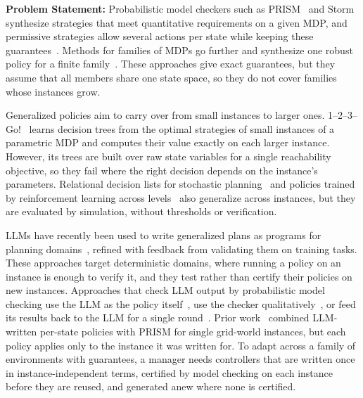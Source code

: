 \textbf{Problem Statement:}
Probabilistic model checkers such as PRISM~\cite{TODO-PRISM} and Storm~\cite{TODO-Storm} synthesize strategies that meet quantitative requirements on a given MDP, and permissive strategies allow several actions per state while keeping these guarantees~\cite{TODO-Draeger2015-permissive}.
Methods for families of MDPs go further and synthesize one robust policy for a finite family~\cite{TODO-Andriushchenko2024-PoliciesGrowOnTrees,TODO-Heck2026-SMPMC}.
These approaches give exact guarantees, but they assume that all members share one state space, so they do not cover families whose instances grow.

Generalized policies aim to carry over from small instances to larger ones.
1--2--3--Go!~\cite{TODO-Azeem2025-123Go} learns decision trees from the optimal strategies of small instances of a parametric MDP and computes their value exactly on each larger instance.
However, its trees are built over raw state variables for a single reachability objective, so they fail where the right decision depends on the instance's parameters.
Relational decision lists for stochastic planning~\cite{TODO-Fern2006-decision-lists} and policies trained by reinforcement learning across levels~\cite{TODO-RL-generalization-across-levels} also generalize across instances, but they are evaluated by simulation, without thresholds or verification.

LLMs have recently been used to write generalized plans as programs for planning domains~\cite{TODO-Silver2024-GenPlan-LLM,TODO-Stein2026-strategy-refinement,TODO-Drexler2026-PromptProvePatch,TODO-Murray2026-GenePlan}, refined with feedback from validating them on training tasks.
These approaches target deterministic domains, where running a policy on an instance is enough to verify it, and they test rather than certify their policies on new instances.
Approaches that check LLM output by probabilistic model checking use the LLM as the policy itself~\cite{TODO-Gross2025-verifying-LLM-decisions}, use the checker qualitatively~\cite{TODO-Lee2025-VeriPlan}, or feed its results back to the LLM for a single round~\cite{TODO-Gross2024-counterfactual-LLM}.
Prior work~\cite{TODO-predecessor-LLMTrust2026} combined LLM-written per-state policies with PRISM for single grid-world instances, but each policy applies only to the instance it was written for.
To adapt across a family of environments with guarantees, a manager needs controllers that are written once in instance-independent terms, certified by model checking on each instance before they are reused, and generated anew where none is certified.

